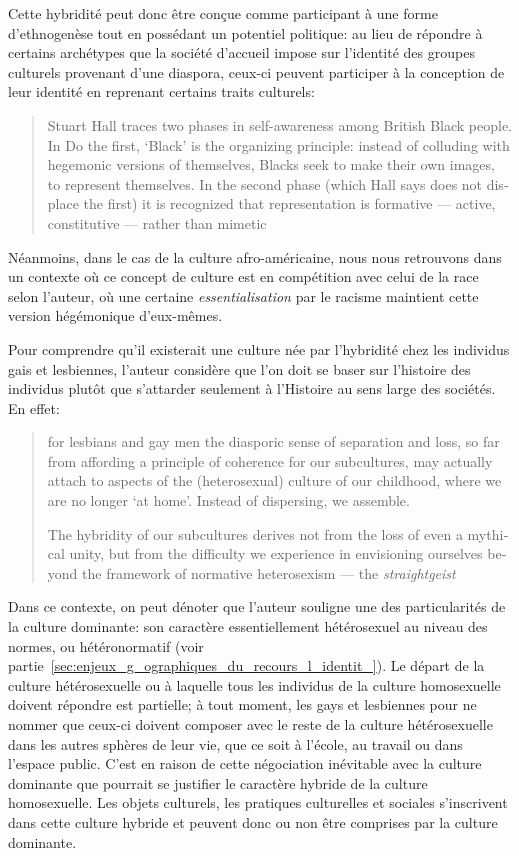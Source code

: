 Cette hybridité peut donc être conçue comme participant à une forme d'ethnogenèse tout en possédant un potentiel politique: au lieu de répondre à certains archétypes que la société d'accueil impose sur l'identité des groupes culturels provenant d'une diaspora, ceux-ci peuvent participer à la conception de leur identité en reprenant certains traits culturels:
\foreignblockquote{english}[{\cite[277]{Sinfield1996}}][.]{Stuart Hall traces two phases in self-awareness among British Black people. In Do the first, `Black' is the organizing principle: instead of colluding with hegemonic versions of themselves, Blacks seek to make their own images, to represent themselves. In the second phase (which Hall says does not displace the first) it is recognized that representation is formative --- active, constitutive --- rather than mimetic}.
Néanmoins, dans le cas de la culture afro-américaine, nous nous retrouvons dans un contexte où ce concept de culture est en compétition avec celui de la race selon l'auteur, où une certaine \emph{essentialisation} par le racisme maintient cette version hégémonique d'eux-mêmes.

Pour comprendre qu'il existerait une culture née par l'hybridité chez les individus gais et lesbiennes, l'auteur considère que l'on doit se baser sur l'histoire des individus plutôt que s'attarder seulement à l'Histoire au sens large des sociétés. 
En effet: \foreignblockquote{english}[{\cite[280]{Sinfield1996}}][.]{\textelp{} for lesbians and gay men the diasporic sense of separation and loss, so far from affording a principle of coherence for our subcultures, may actually attach to aspects of the (heterosexual) culture of our childhood, where we are no longer `at  home'. Instead of dispersing, we assemble.

  The hybridity of our subcultures derives not from the loss of even a mythical unity, but from the difficulty we experience in envisioning ourselves beyond the framework of normative heterosexism --- the \emph{straightgeist} \textelp{}}
Dans ce contexte, on peut dénoter que l'auteur souligne une des particularités de la culture dominante: son caractère essentiellement hétérosexuel au niveau des normes, ou hétéronormatif (voir partie~\ref{sec:enjeux_g_ographiques_du_recours_l_identit_}). 
Le départ de la culture hétérosexuelle ou  à laquelle tous les individus de la culture homosexuelle doivent répondre est partielle; à tout moment, les gays et lesbiennes pour ne nommer que ceux-ci doivent composer avec le reste de la culture hétérosexuelle dans les autres sphères de leur vie, que ce soit à l'école, au travail ou dans l'espace public. 
C'est en raison de cette négociation inévitable avec la culture dominante que pourrait se justifier le caractère hybride de la culture homosexuelle. 
Les objets culturels, les pratiques culturelles et sociales s'inscrivent dans cette culture hybride et peuvent donc ou non être comprises par la culture dominante.

